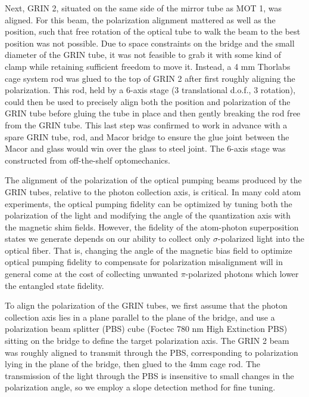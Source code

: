 Next, GRIN 2, situated on the same side of the mirror tube as MOT 1, was aligned. For this beam, the polarization alignment mattered as well as the position, such that free rotation of the optical tube to walk the beam to the best position was not possible. Due to space constraints on the bridge and the small diameter of the GRIN tube, it was not feasible to grab it with some kind of clamp while retaining sufficient freedom to move it. Instead, a 4 mm Thorlabs cage system rod was glued to the top of GRIN 2 after first roughly aligning the polarization. This rod, held by a 6-axis stage (3 translational d.o.f., 3 rotation), could then be used to precisely align both the position and polarization of the GRIN tube before gluing the tube in place and then gently breaking the rod free from the GRIN tube. This last step was confirmed to work in advance with a spare GRIN tube, rod, and Macor bridge to ensure the glue joint between the Macor and glass would win over the glass to steel joint. The 6-axis stage was constructed from off-the-shelf optomechanics.

The alignment of the polarization of the optical pumping beams produced by the GRIN tubes, relative to the photon collection axis, is critical. In many cold atom experiments, the optical pumping fidelity can be optimized by tuning both the polarization of the light and modifying the angle of the quantization axis with the magnetic shim fields. However, the fidelity of the atom-photon superposition states we generate depends on our ability to collect only $\sigma$-polarized light into the optical fiber. That is, changing the angle of the magnetic bias field to optimize optical pumping fidelity to compensate for polarization misalignment will in general come at the cost of collecting unwanted $\pi$-polarized photons which lower the entangled state fidelity. 

To align the polarization of the GRIN tubes, we first assume that the photon collection axis lies in a plane parallel to the plane of the bridge, and use a polarization beam splitter (PBS) cube (Foctec 780 nm High Extinction PBS) sitting on the bridge to define the target polarization axis. The GRIN 2 beam was roughly aligned to transmit through the PBS, corresponding to polarization lying in the plane of the bridge, then glued to the 4mm cage rod. The transmission of the light through the PBS is insensitive to small changes in the polarization angle, so we employ a slope detection method for fine tuning. 

